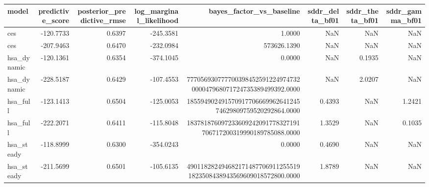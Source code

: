\begin{tabular}{lrrrrrrr}
\toprule
model & predictive\_score & posterior\_predictive\_rmse & log\_marginal\_likelihood & bayes\_factor\_vs\_baseline & sddr\_delta\_bf01 & sddr\_theta\_bf01 & sddr\_gamma\_bf01 \\
\midrule
ces & -120.7733 & 0.6397 & -245.3581 & 1.0000 & NaN & NaN & NaN \\
ces & -207.9463 & 0.6470 & -232.0984 & 573626.1390 & NaN & NaN & NaN \\
hsa\_dynamic & -120.1361 & 0.6354 & -374.1045 & 0.0000 & NaN & 0.1935 & NaN \\
hsa\_dynamic & -228.5187 & 0.6429 & -107.4553 & 777056930777700398452591224974732000047968071724735389499392.0000 & NaN & 2.0207 & NaN \\
hsa\_full & -123.1413 & 0.6504 & -125.0053 & 18559490249157091770666996264124574629809759520292864.0000 & 0.4393 & NaN & 1.2421 \\
hsa\_full & -222.2071 & 0.6411 & -115.8048 & 183781876097233609242091778327191706717200319990189785088.0000 & 1.3529 & NaN & 0.1035 \\
hsa\_steady & -118.8999 & 0.6300 & -354.0243 & 0.0000 & 0.4690 & NaN & NaN \\
hsa\_steady & -211.5699 & 0.6501 & -105.6135 & 4901182824946821714877069112555191823508438943569609018572800.0000 & 1.8789 & NaN & NaN \\
\bottomrule
\end{tabular}

